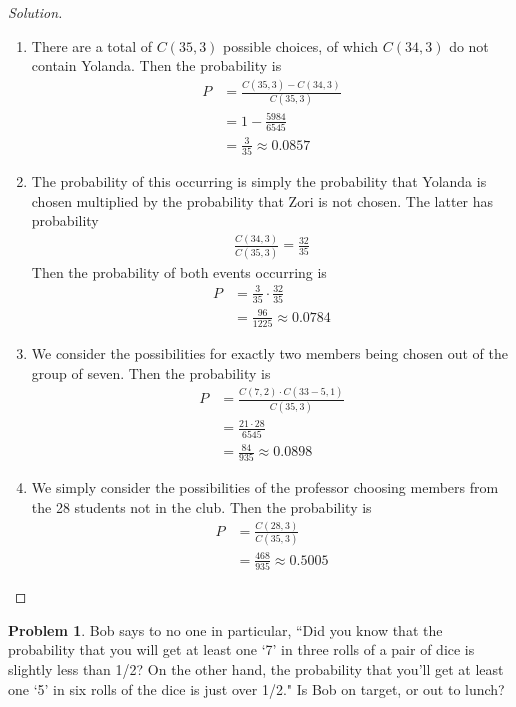 \documentclass[12pt]{article}
\newcounter{chapternumber}
\theoremstyle{definition}
\newtheorem{problem-internal}{Problem}[chapternumber]
\newenvironment{problem}{
  \medskip
  \begin{problem-internal}
}{
\end{problem-internal}
}
\newenvironment{solution}{
  \begin{proof}[Solution]
    \vspace{-8px}
    \setlength{\parskip}{4px}
    \setlength{\parindent}{0px}
}{
\end{proof}
}
\begin{document}
  \begin{solution}
    \hfill
    \begin{enumerate}[label={\alph*.}]
      \item There are a total of \(C(35, 3)\) possible choices,  of which \(C(34, 3)\) do not contain Yolanda. Then the probability is
      \begin{align*}
        P &= \frac{C(35, 3) - C(34, 3)}{C(35, 3)} \\
        &= 1 - \frac{5984}{6545} \\
        &= \frac{3}{35} \approx 0.0857
      \end{align*}

      \item The probability of this occurring is simply the probability that Yolanda is chosen multiplied by the probability that Zori is not chosen. The latter has probability
      \begin{align*}
        \frac{C(34, 3)}{C(35, 3)} = \frac{32}{35}
      \end{align*}
      Then the probability of both events occurring is
      \begin{align*}
        P &= \frac{3}{35} \cdot \frac{32}{35} \\
        &= \frac{96}{1225} \approx 0.0784
      \end{align*}

      \item We consider the possibilities for exactly two members being chosen out of the group of seven. Then the probability is
      \begin{align*}
        P &= \frac{C(7, 2) \cdot C(33 - 5, 1)}{C(35, 3)} \\
        &= \frac{21 \cdot 28}{6545} \\
        &= \frac{84}{935} \approx 0.0898
      \end{align*}

      \item We simply consider the possibilities of the professor choosing members from the 28 students not in the club. Then the probability is
      \begin{align*}
        P &= \frac{C(28, 3)}{C(35, 3)} \\
        &= \frac{468}{935} \approx 0.5005
      \end{align*}
    \end{enumerate}
  \end{solution}


  \begin{problem}
    Bob says to no one in particular, ``Did you know that the probability that you will get at least one `7' in three rolls of a pair of dice is slightly less than 1/2? On the other hand, the probability that you'll get at least one `5' in six rolls of the dice is just over 1/2." Is Bob on target, or out to lunch?
  \end{problem}
\end{document}
